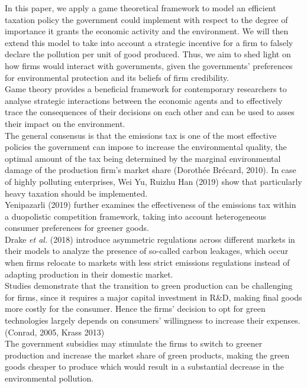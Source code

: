\documentclass{article}
\begin{document}
In this paper, we apply a game theoretical framework to model an efficient taxation policy the government could implement with respect to the degree of importance it grants the economic activity and the environment. We will then extend this model to take into account a strategic incentive for a firm to falsely declare the pollution per unit of good produced. Thus, we aim to shed light on how firms would interact with governments, given the governments' preferences for environmental protection and its beliefs of firm credibility. \\

Game theory provides a beneficial framework for contemporary researchers to analyse strategic interactions between the economic agents and to effectively trace the consequences of their decisions on each other and can be used to asses their impact on the environment. \\

The general consensus is that the emissions tax is one of the most effective policies the government can impose to increase the environmental quality, the optimal amount of the tax being determined by the marginal environmental damage of the production firm's market share (Dorothée Brécard, 2010). In case of highly polluting enterprises, Wei Yu, Ruizhu Han (2019) show that particularly heavy taxation should be implemented. \\

Yenipazarli (2019) further examines the effectiveness of the emissions tax within a duopolistic competition framework, taking into account heterogeneous consumer preferences for greener goods.\\ 

Drake \textit{et al.} (2018) introduce asymmetric regulations across different markets in their models to analyze the presence of so-called carbon leakages, which occur when firms relocate to markets with less strict emissions regulations instead of adapting production in their domestic market.\\

Studies demonstrate that the transition to green production can be challenging for firms, since it requires a major capital investment in R\&D, making final goods more costly for the consumer. Hence the firms’ decision to opt for green technologies largely depends on consumers’ willingness to increase their expenses. (Conrad, 2005, Krass 2013) \\ 

The government subsidies may stimulate the firms to switch to greener production and increase the market share of green products, making the green goods cheaper to produce which would result in a substantial decrease in the environmental pollution.\\
\end{document}
